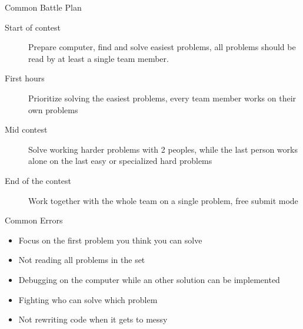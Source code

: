 \documentclass[11pt,pdf, aspectratio=169]{beamer}
\begin{document}
  \begin{frame}{Common Battle Plan}
    \begin{description}
      \item [Start of contest] Prepare computer, find and solve easiest problems, all problems should be read by at least a single team member.
      \item[First hours] Prioritize solving the easiest problems, every team member works on their own problems
      \item[Mid contest] Solve working harder problems with 2 peoples, while the last person works alone on the last easy or specialized hard problems
      \item[End of the contest] Work together with the whole team on a single problem, free submit mode
    \end{description}
  \end{frame}
  \begin{frame}{Common Errors}
    \begin{itemize}
      \item Focus on the first problem you think you can solve
      \item Not reading all problems in the set
      \item Debugging on the computer while an other solution can be implemented
      \item Fighting who can solve which problem
      \item Not rewriting code when it gets to messy
    \end{itemize}
  \end{frame}
\end{document}
